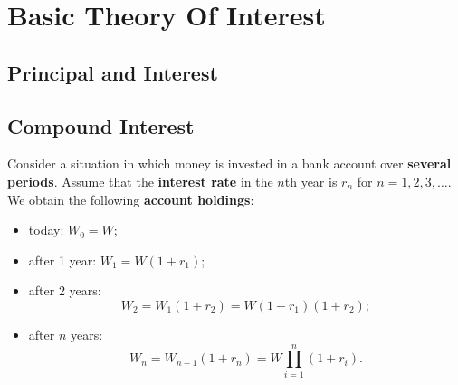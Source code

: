 \chapter{Basic Theory Of Interest}


\section{Principal and Interest}



\section{Compound Interest}
Consider a situation in which money is invested in a bank account over \textbf{several periods}. Assume that the \textbf{interest rate} in the \( n \)th year is \( r_n \) for \( n = 1, 2, 3, \ldots \). We obtain the following \textbf{account holdings}:
\begin{itemize}[label=\textbullet]
    \item today: \( W_0 = W \);
    \item after 1 year: \( W_1 = W(1 + r_1) \);
    \item after 2 years:
          \[
              W_2 = W_1(1 + r_2) = W(1 + r_1)(1 + r_2);
          \]
    \item after \( n \) years:
          \[
              W_n = W_{n-1}(1 + r_n) = W \prod_{i=1}^n (1 + r_i).
          \]
\end{itemize}

